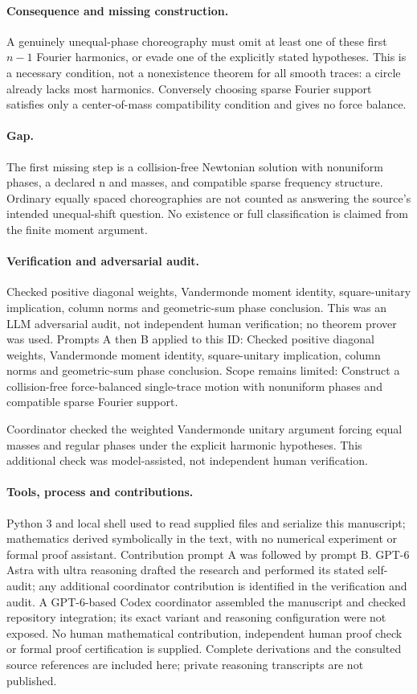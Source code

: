 \documentclass[11pt]{article}
\begin{document}
\paragraph{Consequence and missing construction.}A genuinely unequal-phase choreography must omit at least one of these first \(n-1\) Fourier harmonics, or evade one of the explicitly stated hypotheses. This is a necessary condition, not a nonexistence theorem for all smooth traces: a circle already lacks most harmonics. Conversely choosing sparse Fourier support satisfies only a center-of-mass compatibility condition and gives no force balance.
\paragraph{Gap.}The first missing step is a collision-free Newtonian solution with nonuniform phases, a declared n and masses, and compatible sparse frequency structure. Ordinary equally spaced choreographies are not counted as answering the source's intended unequal-shift question. No existence or full classification is claimed from the finite moment argument.

\paragraph{Verification and adversarial audit.}
Checked positive diagonal weights, Vandermonde moment identity, square-unitary implication, column norms and geometric-sum phase conclusion. This was an LLM adversarial audit, not independent human verification; no theorem prover was used. Prompts A then B applied to this ID: Checked positive diagonal weights, Vandermonde moment identity, square-unitary implication, column norms and geometric-sum phase conclusion. Scope remains limited: Construct a collision-free force-balanced single-trace motion with nonuniform phases and compatible sparse Fourier support.

Coordinator checked the weighted Vandermonde unitary argument forcing equal masses and regular phases under the explicit harmonic hypotheses. This additional check was model-assisted, not independent human verification.

\paragraph{Tools, process and contributions.}
Python 3 and local shell used to read supplied files and serialize this manuscript; mathematics derived symbolically in the text, with no numerical experiment or formal proof assistant. Contribution prompt A was followed by prompt B. GPT-6 Astra with ultra reasoning drafted the research and performed its stated self-audit; any additional coordinator contribution is identified in the verification and audit. A GPT-6-based Codex coordinator assembled the manuscript and checked repository integration; its exact variant and reasoning configuration were not exposed. No human mathematical contribution, independent human proof check or formal proof certification is supplied. Complete derivations and the consulted source references are included here; private reasoning transcripts are not published.
\end{document}
